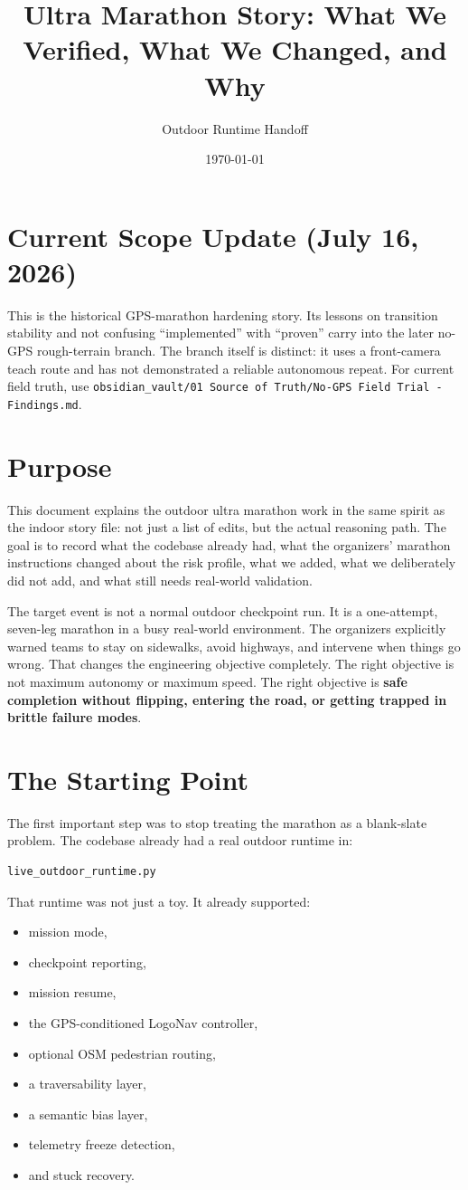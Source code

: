 \documentclass[11pt]{article}
\title{Ultra Marathon Story: What We Verified, What We Changed, and Why}
\author{Outdoor Runtime Handoff}
\date{\today}
\begin{document}
\maketitle
\tableofcontents
\newpage

\section*{Current Scope Update (July 16, 2026)}
This is the historical GPS-marathon hardening story. Its lessons on transition
stability and not confusing ``implemented'' with ``proven'' carry into the
later no-GPS rough-terrain branch. The branch itself is distinct: it uses a
front-camera teach route and has not demonstrated a reliable autonomous repeat.
For current field truth, use
\texttt{obsidian\_vault/01 Source of Truth/No-GPS Field Trial - Findings.md}.

\section{Purpose}
This document explains the outdoor ultra marathon work in the same spirit as the indoor story file: not just a list of edits, but the actual reasoning path. The goal is to record what the codebase already had, what the organizers' marathon instructions changed about the risk profile, what we added, what we deliberately did not add, and what still needs real-world validation.

The target event is not a normal outdoor checkpoint run. It is a one-attempt, seven-leg marathon in a busy real-world environment. The organizers explicitly warned teams to stay on sidewalks, avoid highways, and intervene when things go wrong. That changes the engineering objective completely. The right objective is not maximum autonomy or maximum speed. The right objective is \textbf{safe completion without flipping, entering the road, or getting trapped in brittle failure modes}.

\section{The Starting Point}
The first important step was to stop treating the marathon as a blank-slate problem. The codebase already had a real outdoor runtime in:
\begin{verbatim}
live_outdoor_runtime.py
\end{verbatim}

That runtime was not just a toy. It already supported:
\begin{itemize}[leftmargin=*]
\item mission mode,
\item checkpoint reporting,
\item mission resume,
\item the GPS-conditioned LogoNav controller,
\item optional OSM pedestrian routing,
\item a traversability layer,
\item a semantic bias layer,
\item telemetry freeze detection,
\item and stuck recovery.
\end{itemize}
\end{document}
